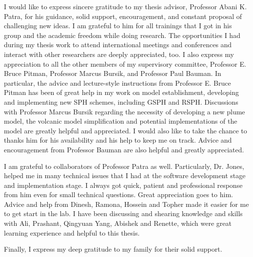 I would like to express sincere gratitude to my thesis advisor, Professor Abani K. Patra, for his
guidance, solid support, encouragement, and constant proposal of challenging new ideas. I am grateful to him for all trainings that I got in his group and the academic freedom while doing research. The opportunities I had during my thesis work to attend international meetings and conferences and interact with other researchers are deeply appreciated, too.
I also express my appreciation to all the other members of my supervisory committee, Professor E. Bruce Pitman, Professor Marcus Bursik, and Professor Paul Bauman. In particular, the advice
and lecture-style instructions from Professor E. Bruce Pitman has been of great help in my work on model establishment, developing and implementing new SPH schemes, including GSPH and RSPH. Discussions with Professor Marcus Bursik regarding the necessity of developing a new plume model, the volcanic model simplification and potential implementations of the model are greatly helpful and appreciated. I would also like to take the chance to thanks him for his availability and his help to keep me on track. Advice and encouragement from Professor Bauman are also helpful and greatly appreciated.

I am grateful to collaborators of Professor Patra as well. Particularly, Dr. Jones, helped me in many technical issues that I had at the software development stage and implementation stage. I always got quick, patient and professional response from him even for small technical questions. Great appreciation goes to him. Advice and help from Dinesh, Ramona, Hossein and Topher made it easier for me to get start in the lab. I have been discussing and shearing knowledge and skills with Ali, Prashant, Qingyuan Yang, Abishek and Renette, which were great learning experience and helpful to this thesis.
 
Finally, I express my deep gratitude to my family for their solid support.